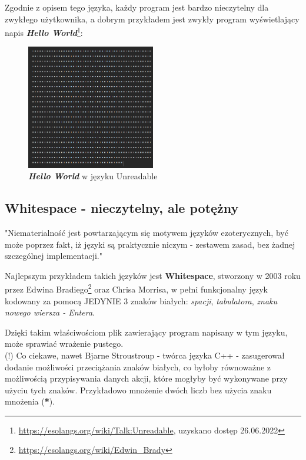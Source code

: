 \documentclass[fleqn,10pt]{SelfArx} %
\begin{document}
Zgodnie z opisem tego języka, każdy program jest bardzo nieczytelny dla zwykłego użytkownika, a dobrym przykładem jest zwykły program wyświetlający napis \textbf{\textit{Hello World}}\footnote{\url{https://esolangs.org/wiki/Talk:Unreadable}, uzyskano dostęp 26.06.2022}:
\begin{figure}[H] %
	\centering %
	\includegraphics[width=0.5\textwidth]{Figures/unreadable.png} %
	\caption{\textbf{\textit{Hello World}} w języku Unreadable}
\end{figure}

\subsection{Whitespace - nieczytelny, ale potężny}
"Niematerialność jest powtarzającym się motywem języków ezoterycznych, być może poprzez fakt, iż języki są praktycznie niczym - zestawem zasad, bez żadnej szczególnej implementacji."\cite{Temkin_2017:articleAll}
\\
\par Najlepszym przykładem takich języków jest \textbf{Whitespace}, stworzony w 2003 roku przez Edwina Bradiego\footnote{\url{https://esolangs.org/wiki/Edwin_Brady}} oraz Chrisa Morrisa, w pełni funkcjonalny język kodowany za pomocą JEDYNIE 3 znaków białych:
\textit{spacji}, \textit{tabulatora}, \textit{znaku nowego wiersza - Entera}.
\par Dzięki takim właściwościom plik zawierający program napisany w tym języku, może sprawiać wrażenie pustego.\\
(!) Co ciekawe, nawet Bjarne Stroustroup - twórca języka C++ - zasugerował dodanie możliwości przeciążania znaków białych, co byłoby równoważne z możliwością przypisywania danych akcji, które mogłyby być wykonywane przy użyciu tych znaków. 
Przykładowo mnożenie dwóch liczb bez użycia znaku mnożenia (\textbf{*}).
\end{document}
